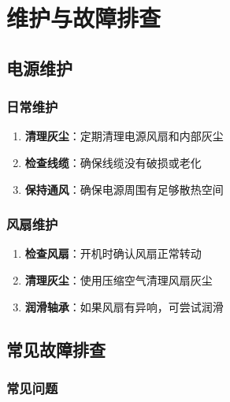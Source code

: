 \documentclass[12pt,UTF8]{ctexbook}
\begin{document}
\part{维护与故障排查}

\chapter{电源维护}

\section{日常维护}

\begin{enumerate}
    \item \textbf{清理灰尘}：定期清理电源风扇和内部灰尘
    \item \textbf{检查线缆}：确保线缆没有破损或老化
    \item \textbf{保持通风}：确保电源周围有足够散热空间
\end{enumerate}

\section{风扇维护}

\begin{enumerate}
    \item \textbf{检查风扇}：开机时确认风扇正常转动
    \item \textbf{清理灰尘}：使用压缩空气清理风扇灰尘
    \item \textbf{润滑轴承}：如果风扇有异响，可尝试润滑
\end{enumerate}

\chapter{常见故障排查}

\section{常见问题}
\end{document}
